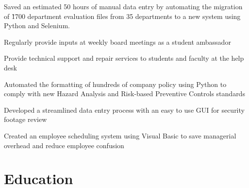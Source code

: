 \documentclass[]{deedy-resume-openfont}
\begin{document}
\begin{tightemize}
\item Saved an estimated 50 hours of manual data entry by automating the migration of \~1700 department evaluation files from 35 departments to a new system using Python and Selenium.
\item Regularly provide inputs at weekly board meetings as a student ambassador
\item Provide technical support and repair services to students and faculty at the help desk
\end{tightemize}
\sectionsep

\begin{tightemize}
\item Automated the formatting of hundreds of company policy using Python to comply with new Hazard Analysis and Risk-based Preventive Controls standards
\item Developed a streamlined data entry process with an easy to use GUI for security footage review
\item Created an employee scheduling system using Visual Basic to save managerial overhead and reduce employee confusion
\end{tightemize}
\sectionsep

\section{Education}
\sectionsep
\end{document}
